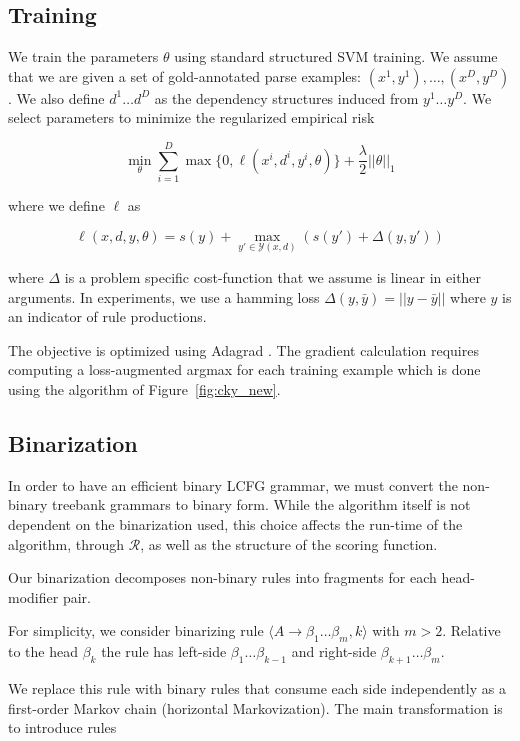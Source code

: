 \documentclass[11pt,letterpaper]{article}
\newcommand{\rules}{\mathcal{R}}
\begin{document}
\subsection{Training}

We train the parameters $\theta$ using standard structured SVM training.
We assume that we are given a set of gold-annotated parse examples: $( x^{1}, y^{1}), \ldots,  (x^{D}, y^{D})$. We also define $d^{1} \ldots d^{D}$ as the dependency structures induced from $y^{1} \ldots y^{D}$.
We select parameters to minimize the regularized empirical risk

\[ \min_{\theta} \sum_{i = 1}^D \max\{0,  \ell( x^{i}, d^{i} , y^{i}, \theta) \} + \frac{\lambda}{2} ||\theta||_1 \]

\noindent where we define $\ell$ as

\[\ell(x, d, y, \theta) = s(y) + \max_{y' \in \mathcal{Y}(x, d)}\left(s(y')  + \Delta(y, y') \right) \]


\noindent where $\Delta$ is a problem specific cost-function that we assume is linear in either arguments.
In experiments, we use a hamming loss  $\Delta(y, \bar{y}) = || y - \bar{y}||$ where $y$ is an indicator
of rule productions.

The objective is optimized using Adagrad \cite{}.  The gradient
calculation requires computing a loss-augmented argmax for each
training example which is done using the algorithm of Figure~\ref{fig:cky_new}.

\subsection{Binarization}

In order to have an efficient binary LCFG grammar, we must convert the
non-binary treebank grammars to binary form.  While the algorithm
itself is not dependent on the binarization used, this choice affects
the run-time of the algorithm, through $\rules$, as well as the
structure of the scoring function.

Our binarization decomposes non-binary rules into fragments for
each head-modifier pair.

For simplicity, we consider binarizing rule $\langle A \rightarrow \beta_1 \ldots \beta_m,
k\rangle$ with $m > 2$. Relative to the head $\beta_k$
the rule has left-side $\beta_1 \ldots \beta_{k-1}$ and right-side
$\beta_{k+1} \ldots \beta_m$.

We replace this rule with binary rules that consume each side
independently as a first-order Markov chain (horizontal Markovization).
The main transformation is to introduce rules
\end{document}

